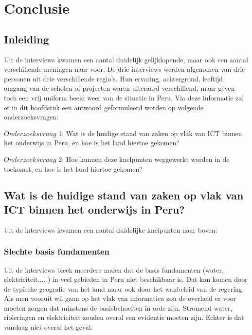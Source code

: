 

\chapter{Conclusie}
\label{ch:conclusie}


\section{Inleiding}
Uit de interviews kwamen een aantal duidelijk gelijklopende, maar ook een aantal verschillende meningen naar voor. De drie interviews werden afgenomen van drie personen uit drie verschillende regio's. Hun ervaring, achtergrond, leeftijd, omgang van de scholen of projecten waren uiteraard verschillend, maar geven toch een vrij uniform beeld weer van de situatie in Peru. Via deze informatie zal er in dit hoofdstuk een antwoord geformuleerd worden op volgende onderzoeksvragen:

$Onderzoeksvraag$ 1: Wat is de huidige stand van zaken op vlak van ICT binnen het onderwijs in Peru, en hoe is het land hiertoe gekomen?

$Onderzoeksvraag$ 2: Hoe kunnen deze knelpunten weggewerkt worden in de toekomst, en hoe is het land hiertoe gekomen?

\section{Wat is de huidige stand van zaken op vlak van ICT binnen het onderwijs in Peru?}
Uit de interviews kwamen een aantal duidelijke knelpunten naar boven:



\subsection{Slechte basis fundamenten}
Uit de interviews bleek meerdere malen dat de basis fundamenten (water, elektriciteit,... ) in veel gebieden in Peru niet beschikbaar is. Dat kan komen door de typische geografie van het land maar ook door het wanbeleid van de regering. Als men vooruit wil gaan op het vlak van informatica zou de overheid er voor moeten zorgen dat minstens de basisbehoeften in orde zijn. Stromend water, rioleringen en elektriciteit zouden overal een evidentie moeten zijn. Echter is dat vandaag niet overal het geval.


